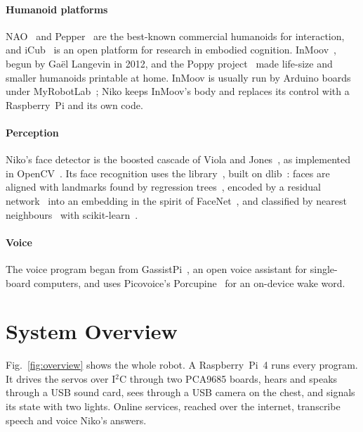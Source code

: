 \documentclass[11pt]{article}
\begin{document}
\paragraph{Humanoid platforms} NAO~\cite{gouaillier2009nao} and Pepper~\cite{pandey2018pepper} are the best-known commercial humanoids for interaction, and iCub~\cite{metta2008icub} is an open platform for research in embodied cognition. InMoov~\cite{inmoov}, begun by Gaël Langevin in 2012, and the Poppy project~\cite{lapeyre2014poppy} made life-size and smaller humanoids printable at home. InMoov is usually run by Arduino boards under MyRobotLab~\cite{myrobotlab}; Niko keeps InMoov's body and replaces its control with a Raspberry~Pi and its own code.

\paragraph{Perception} Niko's face detector is the boosted cascade of Viola and Jones~\cite{viola2001rapid}, as implemented in OpenCV~\cite{bradski2000opencv}. Its face recognition uses the  library~\cite{facerecognition}, built on dlib~\cite{king2009dlib}: faces are aligned with landmarks found by regression trees~\cite{kazemi2014one}, encoded by a residual network~\cite{he2016resnet} into an embedding in the spirit of FaceNet~\cite{schroff2015facenet}, and classified by nearest neighbours~\cite{cover1967nearest} with scikit-learn~\cite{pedregosa2011sklearn}.

\paragraph{Voice} The voice program began from GassistPi~\cite{gassistpi}, an open voice assistant for single-board computers, and uses Picovoice's Porcupine~\cite{porcupine} for an on-device wake word.

\section{System Overview}
\label{sec:overview}

Fig.~\ref{fig:overview} shows the whole robot. A Raspberry~Pi~4 runs every program. It drives the servos over I$^2$C through two PCA9685 boards, hears and speaks through a USB sound card, sees through a USB camera on the chest, and signals its state with two lights. Online services, reached over the internet, transcribe speech and voice Niko's answers.
\end{document}
